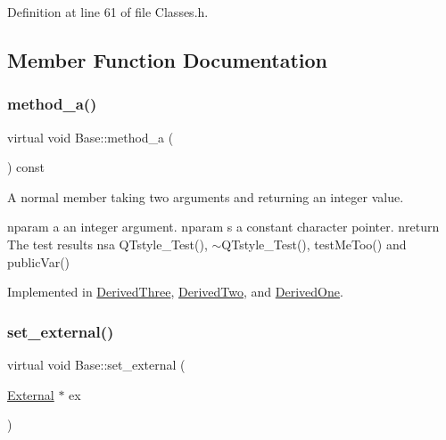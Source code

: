 Definition at line 61 of file Classes.\+h.



\subsection{Member Function Documentation}
\mbox{\label{class_base_ace5096ac7dfb41f2577321923e3048bf}} 
\subsubsection{\texorpdfstring{method\+\_\+a()}{method\_a()}}
{\footnotesize\ttfamily virtual void Base\+::method\+\_\+a (\begin{DoxyParamCaption}{ }\end{DoxyParamCaption}) const\hspace{0.3cm}{\ttfamily [pure virtual]}}



A normal member taking two arguments and returning an integer value. 

nparam a an integer argument. nparam s a constant character pointer. nreturn The test results nsa Q\+Tstyle\+\_\+\+Test(), $\sim$\+Q\+Tstyle\+\_\+\+Test(), test\+Me\+Too() and public\+Var() 

Implemented in \hyperlink{class_derived_three_a74d2afff499ae551a424aa5d1da14620}{Derived\+Three}, \hyperlink{class_derived_two_ae83bc07728d0af09413c6eb91c840e1d}{Derived\+Two}, and \hyperlink{class_derived_one_a2843e6e6fd03fa84efda261cd1bbc10d}{Derived\+One}.

\mbox{\label{class_base_a87ec2d3dcffa1d22d4fe4f651f625d49}} 
\subsubsection{\texorpdfstring{set\+\_\+external()}{set\_external()}}
{\footnotesize\ttfamily virtual void Base\+::set\+\_\+external (\begin{DoxyParamCaption}\item[{\hyperlink{class_external}{External} $\ast$}]{ex }\end{DoxyParamCaption})\hspace{0.3cm}{\ttfamily [pure virtual]}}




